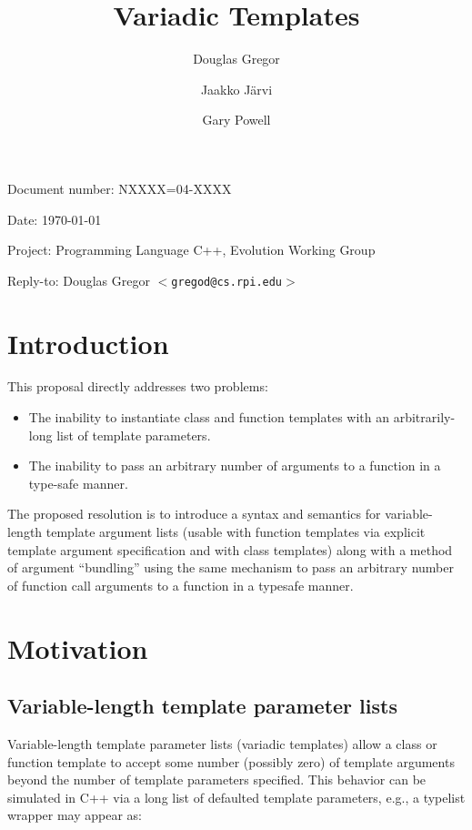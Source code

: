 \documentclass{article}
\begin{document}
\pagestyle{myheadings}

\title{Variadic Templates}
\author{Douglas Gregor \and Jaakko J\"arvi \and Gary Powell}
\date{}
\maketitle

\par\noindent Document number: NXXXX=04-XXXX
\par\noindent Date: \today
\par\noindent Project: Programming Language C++, Evolution Working Group
\par\noindent Reply-to: Douglas Gregor $<${\tt gregod@cs.rpi.edu}$>$

\section{Introduction}
This proposal directly addresses two problems:
\begin{itemize}
\item The inability to instantiate class and function templates with an arbitrarily-long list of template parameters.
\item The inability to pass an arbitrary number of arguments to a function in a type-safe manner.
\end{itemize}

The proposed resolution is to introduce a syntax and semantics for
variable-length template argument lists (usable with function templates
via explicit template argument specification and with class templates)
along with a method of argument ``bundling'' using the same mechanism to
pass an arbitrary number of function call arguments to a function in a
typesafe manner.

\section{Motivation}
\subsection{Variable-length template parameter lists}
Variable-length template parameter lists (variadic templates) allow a
class or function template to accept some number (possibly zero) of
template arguments beyond the number of template parameters specified.
This behavior can be simulated in C++ via a long list of defaulted
template parameters, e.g., a typelist wrapper may appear as:
\end{document}
